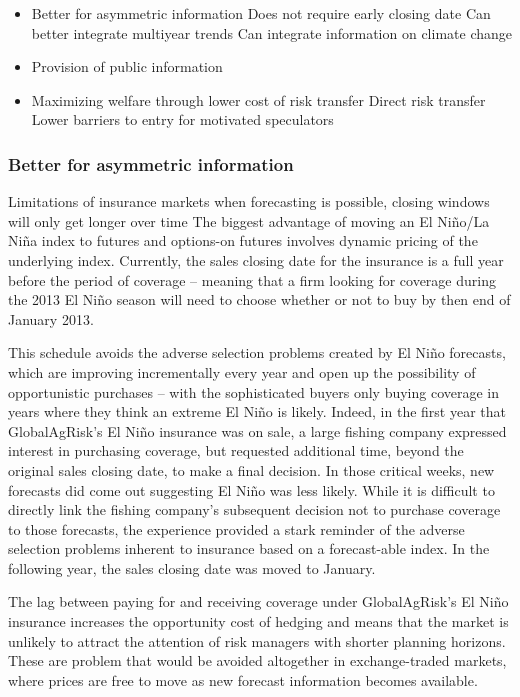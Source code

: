 \documentclass[authoryear]{article}
\begin{document}
\begin{itemize}
\item Better for asymmetric information
  \subitem Does not require early closing date
  \subitem Can better integrate multiyear trends
  \subitem Can integrate information on climate change
\item Provision of public information
\item Maximizing welfare through lower cost of risk transfer
  \subitem Direct risk transfer
  \subitem Lower barriers to entry for motivated speculators
\end{itemize}

\subsubsection{Better for asymmetric information} Limitations of insurance markets when forecasting is possible, closing windows will only get longer over time
The biggest advantage of moving an El Ni\~no/La Ni\~na index to futures and options-on futures involves dynamic pricing of the underlying index. Currently, the sales closing date for the insurance is a full year before the period of coverage – meaning that a firm looking for coverage during the 2013 El Ni\~no season will need to choose whether or not to buy by then end of January 2013. 

This schedule avoids the adverse selection problems created by El Ni\~no forecasts, which are improving incrementally every year and open up the possibility of opportunistic purchases – with the sophisticated buyers only buying coverage in years where they think an extreme El Ni\~no is likely. Indeed, in the first year that GlobalAgRisk’s El Ni\~no insurance was on sale, a large fishing company expressed interest in purchasing coverage, but requested additional time, beyond the original sales closing date, to make a final decision. In those critical weeks, new forecasts did come out suggesting El Ni\~no was less likely. While it is difficult to directly link the fishing company's subsequent decision not to purchase coverage to those forecasts, the experience provided a stark reminder of the adverse selection problems inherent to insurance based on a forecast-able index. In the following year, the sales closing date was moved to January. 

The lag between paying for and receiving coverage under GlobalAgRisk’s El Ni\~no insurance increases the opportunity cost of hedging and means that the market is unlikely to attract the attention of risk managers with shorter planning horizons. These are problem that would be avoided altogether in exchange-traded markets, where prices are free to move as new forecast information becomes available.
\end{document}
